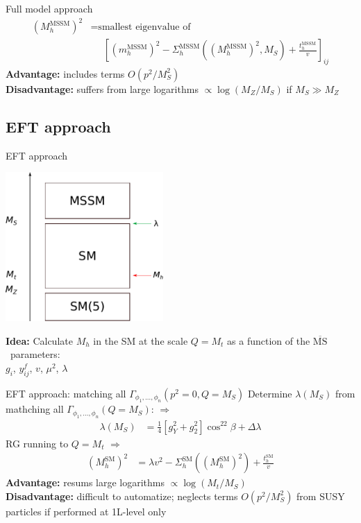 \documentclass[hyperref={pdfpagelabels=false},ngerman]{beamer}
\renewcommand{\emph}{\textbf}
\newcommand{\MSbar}{\ensuremath{\overline{\text{MS}}}}
\newcommand{\SM}{\ensuremath{\text{SM}}}
\begin{document}
\begin{frame}{Full model approach}
  \begin{align*}
    (M_h^\text{MSSM})^2 &= \text{smallest eigenvalue of} \\
    &\phantom{={}} \left[(m_h^\text{MSSM})^2 - \Sigma^\text{MSSM}_h((M_h^\text{MSSM})^2,M_S)
      + \frac{t_h^\text{MSSM}}{v}\right]_{ij}
  \end{align*}
  \emph{Advantage:} includes terms $O(p^2/M_S^2)$\\
  \emph{Disadvantage:} suffers from large logarithms $\propto\log(M_Z/M_S)$ if $M_S\gg M_Z$\\
\end{frame}


\subsection{EFT approach}

\begin{frame}{EFT approach}
  \begin{center}
    \includegraphics[width=0.45\textwidth]{images/mssm-sm-tower-eft}\\[1em]
  \end{center}
  \emph{Idea:} Calculate $M_h$ in the SM at the scale $Q = M_t$ as a function of the \MSbar\ parameters:\\[1em]
  \centering $g_i$, $y^f_{ij}$, $v$, $\mu^2$, $\lambda$
\end{frame}

\begin{frame}{EFT approach: matching all $\Gamma_{\phi_1,\ldots,\phi_n}(p^2 = 0, Q = M_S)$}
  Determine $\lambda(M_S)$ from mathching all $\Gamma_{\phi_1,\ldots,\phi_n}(Q = M_S)$:
  $\Rightarrow$
  \begin{align*}
    \lambda (M_S) &= \frac{1}{4}\left[g_Y^{2} + g_2^2\right] \cos^22\beta
    + \Delta \lambda
  \end{align*}
  RG running to $Q=M_t$ $\Rightarrow$
  \begin{align*}
    (M_h^\SM)^2 &= \lambda v^2 - \Sigma^\SM_h((M_h^\SM)^2) + \frac{t_h^\SM}{v}
  \end{align*}
  \emph{Advantage:} resums large logarithms $\propto\log(M_t/M_S)$\\
  \emph{Disadvantage:} difficult to automatize; neglects terms
  $O(p^2/M_S^2)$ from SUSY particles if performed at 1L-level only
\end{frame}
\end{document}
